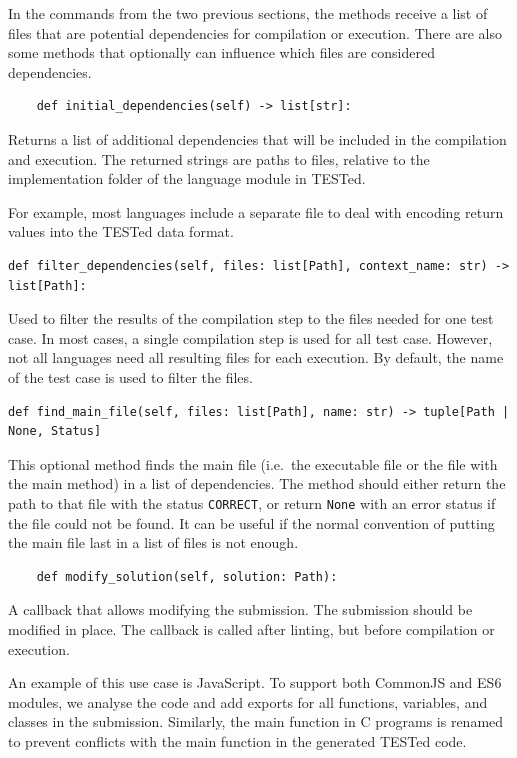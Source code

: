 \documentclass[../main]{subfiles}
\begin{document}
In the commands from the two previous sections, the methods receive a list of files that are potential dependencies for compilation or execution.
There are also some methods that optionally can influence which files are considered dependencies.

\begin{verbatim}
    def initial_dependencies(self) -> list[str]:
\end{verbatim}

Returns a list of additional dependencies that will be included in the compilation and execution.
The returned strings are paths to files, relative to the implementation folder of the language module in TESTed.

For example, most languages include a separate file to deal with encoding return values into the TESTed data format.

\begin{verbatim}
def filter_dependencies(self, files: list[Path], context_name: str) -> list[Path]:
\end{verbatim}

Used to filter the results of the compilation step to the files needed for one test case.
In most cases, a single compilation step is used for all test case.
However, not all languages need all resulting files for each execution.
By default, the name of the test case is used to filter the files.

\begin{verbatim}
def find_main_file(self, files: list[Path], name: str) -> tuple[Path | None, Status]
\end{verbatim}

This optional method finds the main file (i.e.\ the executable file or the file with the main method) in a list of dependencies.
The method should either return the path to that file with the status \texttt{CORRECT}, or return \texttt{None} with an error status if the file could not be found.
It can be useful if the normal convention of putting the main file last in a list of files is not enough.

\begin{verbatim}
    def modify_solution(self, solution: Path):
\end{verbatim}

A callback that allows modifying the submission.
The submission should be modified in place.
The callback is called after linting, but before compilation or execution.

An example of this use case is JavaScript.
To support both CommonJS and ES6 modules, we analyse the code and add exports for all functions, variables, and classes in the submission.
Similarly, the main function in C programs is renamed to prevent conflicts with the main function in the generated TESTed code.
\end{document}
